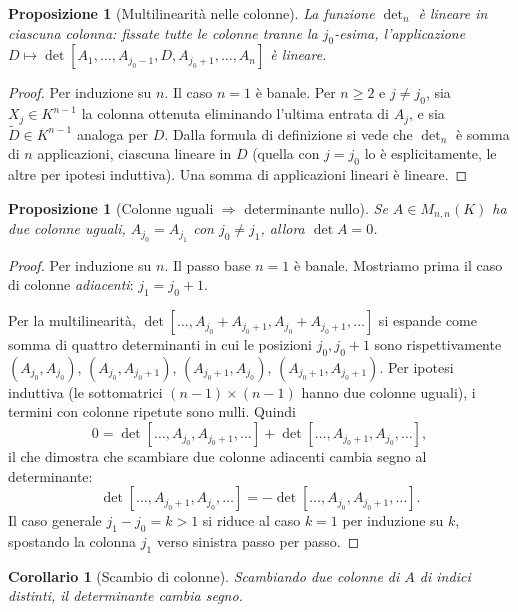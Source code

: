 \documentclass[11pt, a4paper]{book}
\theoremstyle{definition}
\theoremstyle{plain}
\newtheorem{proposizione}[definizione]{Proposizione}
\newtheorem{corollario}[definizione]{Corollario}
\theoremstyle{remark}
\begin{document}
\begin{proposizione}[Multilinearità nelle colonne]
\label{prop:multilineare}
La funzione $\det_n$ è lineare in ciascuna colonna: fissate tutte le colonne tranne la $j_0$-esima, l'applicazione $D \mapsto \det[A_1,\ldots,A_{j_0-1},D,A_{j_0+1},\ldots,A_n]$ è lineare.
\end{proposizione}

\begin{proof}
Per induzione su $n$. Il caso $n=1$ è banale. Per $n \geq 2$ e $j \neq j_0$, sia $X_j \in K^{n-1}$ la colonna ottenuta eliminando l'ultima entrata di $A_j$, e sia $\tilde D \in K^{n-1}$ analoga per $D$. Dalla formula di definizione si vede che $\det_n$ è somma di $n$ applicazioni, ciascuna lineare in $D$ (quella con $j = j_0$ lo è esplicitamente, le altre per ipotesi induttiva). Una somma di applicazioni lineari è lineare.
\end{proof}

\begin{proposizione}[Colonne uguali $\Rightarrow$ determinante nullo]
\label{prop:col-uguali}
Se $A \in M_{n,n}(K)$ ha due colonne uguali, $A_{j_0} = A_{j_1}$ con $j_0 \neq j_1$, allora $\det A = 0$.
\end{proposizione}

\begin{proof}
Per induzione su $n$. Il passo base $n=1$ è banale. Mostriamo prima il caso di colonne \emph{adiacenti}: $j_1 = j_0+1$.

Per la multilinearità, $\det[\ldots, A_{j_0}+A_{j_0+1}, A_{j_0}+A_{j_0+1},\ldots]$ si espande come somma di quattro determinanti in cui le posizioni $j_0, j_0+1$ sono rispettivamente $(A_{j_0},A_{j_0})$, $(A_{j_0},A_{j_0+1})$, $(A_{j_0+1},A_{j_0})$, $(A_{j_0+1},A_{j_0+1})$. Per ipotesi induttiva (le sottomatrici $(n-1)\times(n-1)$ hanno due colonne uguali), i termini con colonne ripetute sono nulli. Quindi
\[
  0 = \det[\ldots,A_{j_0},A_{j_0+1},\ldots] + \det[\ldots,A_{j_0+1},A_{j_0},\ldots],
\]
il che dimostra che scambiare due colonne adiacenti cambia segno al determinante:
\begin{equation}
  \label{eq:scambio-adiacenti}
  \det[\ldots,A_{j_0+1},A_{j_0},\ldots] = -\det[\ldots,A_{j_0},A_{j_0+1},\ldots].
\end{equation}
Il caso generale $j_1 - j_0 = k > 1$ si riduce al caso $k=1$ per induzione su $k$, spostando la colonna $j_1$ verso sinistra passo per passo.
\end{proof}

\begin{corollario}[Scambio di colonne]
\label{cor:scambio-colonne}
Scambiando due colonne di $A$ di indici distinti, il determinante cambia segno.
\end{corollario}
\end{document}
